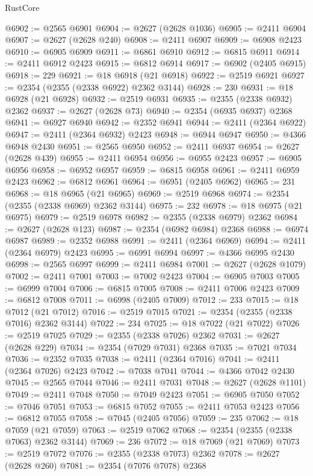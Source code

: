 \begin{lexlean}{RustCore}
\begin{coremodule}
@6902 := @2565 @6901
@6904 := @2627 (@2628 @1036)
@6905 := @2411 @6904
@6907 := @2627 (@2628 @240)
@6908 := @2411 @6907
@6909 := @6908 @2423
@6910 := @6905 @6909
@6911 := @6861 @6910
@6912 := @6815 @6911
@6914 := @2411 @6912 @2423
@6915 := @6812 @6914
@6917 := @6902 (@2405 @6915)
@6918 := 229
@6921 := @18 @6918 (@21 @6918)
@6922 := @2519 @6921
@6927 := @2354 (@2355 (@2338 @6922) @2362 @3144)
@6928 := 230
@6931 := @18 @6928 (@21 @6928)
@6932 := @2519 @6931
@6935 := @2355 (@2338 @6932) @2362
@6937 := @2627 (@2628 @73)
@6940 := @2354 (@6935 @6937) @2368
@6941 := @6927 @6940
@6942 := @2352 @6941
@6944 := @2411 (@2364 @6922)
@6947 := @2411 (@2364 @6932) @2423
@6948 := @6944 @6947
@6950 := @4366 @6948 @2430
@6951 := @2565 @6950
@6952 := @2411 @6937
@6954 := @2627 (@2628 @439)
@6955 := @2411 @6954
@6956 := @6955 @2423
@6957 := @6905 @6956
@6958 := @6952 @6957
@6959 := @6815 @6958
@6961 := @2411 @6959 @2423
@6962 := @6812 @6961
@6964 := @6951 (@2405 @6962)
@6965 := 231
@6968 := @18 @6965 (@21 @6965)
@6969 := @2519 @6968
@6974 := @2354 (@2355 (@2338 @6969) @2362 @3144)
@6975 := 232
@6978 := @18 @6975 (@21 @6975)
@6979 := @2519 @6978
@6982 := @2355 (@2338 @6979) @2362
@6984 := @2627 (@2628 @123)
@6987 := @2354 (@6982 @6984) @2368
@6988 := @6974 @6987
@6989 := @2352 @6988
@6991 := @2411 (@2364 @6969)
@6994 := @2411 (@2364 @6979) @2423
@6995 := @6991 @6994
@6997 := @4366 @6995 @2430
@6998 := @2565 @6997
@6999 := @2411 @6984
@7001 := @2627 (@2628 @1079)
@7002 := @2411 @7001
@7003 := @7002 @2423
@7004 := @6905 @7003
@7005 := @6999 @7004
@7006 := @6815 @7005
@7008 := @2411 @7006 @2423
@7009 := @6812 @7008
@7011 := @6998 (@2405 @7009)
@7012 := 233
@7015 := @18 @7012 (@21 @7012)
@7016 := @2519 @7015
@7021 := @2354 (@2355 (@2338 @7016) @2362 @3144)
@7022 := 234
@7025 := @18 @7022 (@21 @7022)
@7026 := @2519 @7025
@7029 := @2355 (@2338 @7026) @2362
@7031 := @2627 (@2628 @229)
@7034 := @2354 (@7029 @7031) @2368
@7035 := @7021 @7034
@7036 := @2352 @7035
@7038 := @2411 (@2364 @7016)
@7041 := @2411 (@2364 @7026) @2423
@7042 := @7038 @7041
@7044 := @4366 @7042 @2430
@7045 := @2565 @7044
@7046 := @2411 @7031
@7048 := @2627 (@2628 @1101)
@7049 := @2411 @7048
@7050 := @7049 @2423
@7051 := @6905 @7050
@7052 := @7046 @7051
@7053 := @6815 @7052
@7055 := @2411 @7053 @2423
@7056 := @6812 @7055
@7058 := @7045 (@2405 @7056)
@7059 := 235
@7062 := @18 @7059 (@21 @7059)
@7063 := @2519 @7062
@7068 := @2354 (@2355 (@2338 @7063) @2362 @3144)
@7069 := 236
@7072 := @18 @7069 (@21 @7069)
@7073 := @2519 @7072
@7076 := @2355 (@2338 @7073) @2362
@7078 := @2627 (@2628 @260)
@7081 := @2354 (@7076 @7078) @2368

\end{coremodule}
\end{lexlean}
